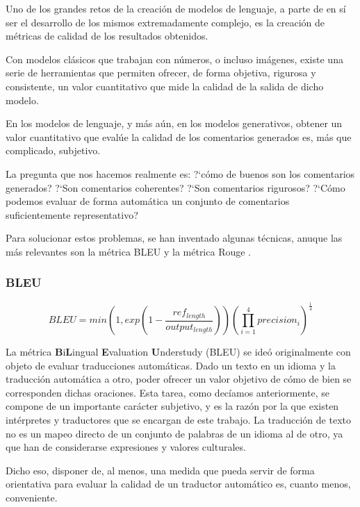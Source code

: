 Uno de los grandes retos de la creación de modelos de lenguaje, a parte de en sí ser el desarrollo de los mismos extremadamente complejo, es la creación de métricas de calidad de los resultados obtenidos.

Con modelos clásicos que trabajan con números, o incluso imágenes, existe una serie de herramientas que permiten ofrecer, de forma objetiva, rigurosa y consistente, un valor cuantitativo que mide la calidad de la salida de dicho modelo.

En los modelos de lenguaje, y más aún, en los modelos generativos, obtener un valor cuantitativo que evalúe la calidad de los comentarios generados es, más que complicado, subjetivo.

La pregunta que nos hacemos realmente es: ?`cómo de buenos son los comentarios generados? ?`Son comentarios coherentes? ?`Son comentarios rigurosos? ?`Cómo podemos evaluar de forma automática un conjunto de comentarios suficientemente representativo?

Para solucionar estos problemas, se han inventado algunas técnicas, anuque las más relevantes son la métrica BLEU \cite{BLEU} y la métrica Rouge \cite{lin2004rouge}.

\subsubsection{BLEU}

\begin{equation}
	BLEU = min\left( 1, exp\left( 1 - \frac{ref_{length}}{output_{length}} \right) \right) \left( \prod^{4}_{i=1} precision_i \right)^{\frac{1}{4}}
\end{equation}

La métrica \textbf{B}i\textbf{L}ingual \textbf{E}valuation \textbf{U}nderstudy (BLEU) se ideó originalmente con objeto de evaluar traducciones automáticas. Dado un texto en un idioma y la traducción automática a otro, poder ofrecer un valor objetivo de cómo de bien se corresponden dichas oraciones. Esta tarea, como decíamos anteriormente, se compone de un importante carácter subjetivo, y es la razón por la que existen intérpretes y traductores que se encargan de este trabajo. La traducción de texto no es un mapeo directo de un conjunto de palabras de un idioma al de otro, ya que han de considerarse expresiones y valores culturales.

Dicho eso, disponer de, al menos, una medida que pueda servir de forma orientativa para evaluar la calidad de un traductor automático es, cuanto menos, conveniente.

